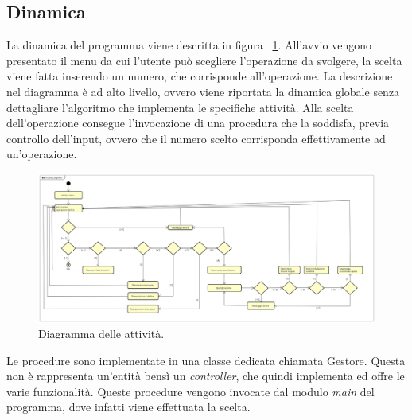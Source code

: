 \subsection{Dinamica}
La dinamica del programma viene descritta in figura \Fig~\ref{fig:ActivityDiagram}. All'avvio vengono presentato il menu da cui l'utente può scegliere l'operazione da svolgere, la scelta viene fatta inserendo un numero, che corrisponde all'operazione. La descrizione nel diagramma è ad alto livello, ovvero viene riportata la dinamica globale senza dettagliare l'algoritmo che implementa le specifiche attività. 
Alla scelta dell'operazione consegue l'invocazione di una procedura che la soddisfa, previa controllo dell'input, ovvero che il numero scelto corrisponda effettivamente ad un'operazione.
\begin{figure}[ht]
	\centering
	\includegraphics[width=0.7\linewidth]{ImageFiles/c++/ActivityDiagram}
	\caption{Diagramma delle attività.}
	\label{fig:ActivityDiagram}
\end{figure}
Le procedure sono implementate in una classe dedicata chiamata Gestore. Questa non è rappresenta un'entità bensì un \textit{controller}, che quindi implementa ed offre le varie funzionalità. Queste procedure vengono invocate dal modulo \textit{main} del programma, dove infatti viene effettuata la scelta.

